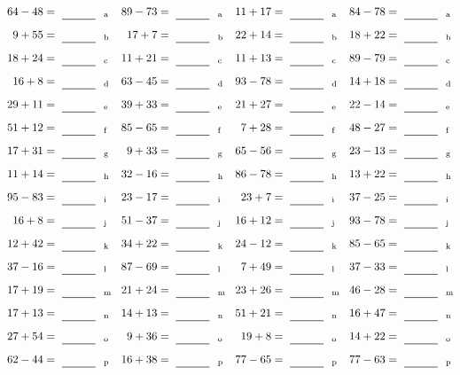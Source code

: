 \documentclass
[
  draft    = true,
  fontsize = 11pt,
  parskip  = half-
]
{scrartcl}
\begin{document}
\clearpage
\begin{align*}
    \pline{64-48}&=\rline{a}
  & \pline{89-73}&=\rline{a}
  & \pline{11+17}&=\rline{a}
  & \pline{84-78}&=\rline{a} \\[1ex]
    \pline{9+55}&=\rline{b}
  & \pline{17+7}&=\rline{b}
  & \pline{22+14}&=\rline{b}
  & \pline{18+22}&=\rline{b} \\[1ex]
    \pline{18+24}&=\rline{c}
  & \pline{11+21}&=\rline{c}
  & \pline{11+13}&=\rline{c}
  & \pline{89-79}&=\rline{c} \\[1ex]
    \pline{16+8}&=\rline{d}
  & \pline{63-45}&=\rline{d}
  & \pline{93-78}&=\rline{d}
  & \pline{14+18}&=\rline{d} \\[1ex]
    \pline{29+11}&=\rline{e}
  & \pline{39+33}&=\rline{e}
  & \pline{21+27}&=\rline{e}
  & \pline{22-14}&=\rline{e} \\[1ex]
    \pline{51+12}&=\rline{f}
  & \pline{85-65}&=\rline{f}
  & \pline{7+28}&=\rline{f}
  & \pline{48-27}&=\rline{f} \\[1ex]
    \pline{17+31}&=\rline{g}
  & \pline{9+33}&=\rline{g}
  & \pline{65-56}&=\rline{g}
  & \pline{23-13}&=\rline{g} \\[1ex]
    \pline{11+14}&=\rline{h}
  & \pline{32-16}&=\rline{h}
  & \pline{86-78}&=\rline{h}
  & \pline{13+22}&=\rline{h} \\[1ex]
    \pline{95-83}&=\rline{i}
  & \pline{23-17}&=\rline{i}
  & \pline{23+7}&=\rline{i}
  & \pline{37-25}&=\rline{i} \\[1ex]
    \pline{16+8}&=\rline{j}
  & \pline{51-37}&=\rline{j}
  & \pline{16+12}&=\rline{j}
  & \pline{93-78}&=\rline{j} \\[1ex]
    \pline{12+42}&=\rline{k}
  & \pline{34+22}&=\rline{k}
  & \pline{24-12}&=\rline{k}
  & \pline{85-65}&=\rline{k} \\[1ex]
    \pline{37-16}&=\rline{l}
  & \pline{87-69}&=\rline{l}
  & \pline{7+49}&=\rline{l}
  & \pline{37-33}&=\rline{l} \\[1ex]
    \pline{17+19}&=\rline{m}
  & \pline{21+24}&=\rline{m}
  & \pline{23+26}&=\rline{m}
  & \pline{46-28}&=\rline{m} \\[1ex]
    \pline{17+13}&=\rline{n}
  & \pline{14+13}&=\rline{n}
  & \pline{51+21}&=\rline{n}
  & \pline{16+47}&=\rline{n} \\[1ex]
    \pline{27+54}&=\rline{o}
  & \pline{9+36}&=\rline{o}
  & \pline{19+8}&=\rline{o}
  & \pline{14+22}&=\rline{o} \\[1ex]
    \pline{62-44}&=\rline{p}
  & \pline{16+38}&=\rline{p}
  & \pline{77-65}&=\rline{p}
  & \pline{77-63}&=\rline{p}
\end{align*}
\end{document}
